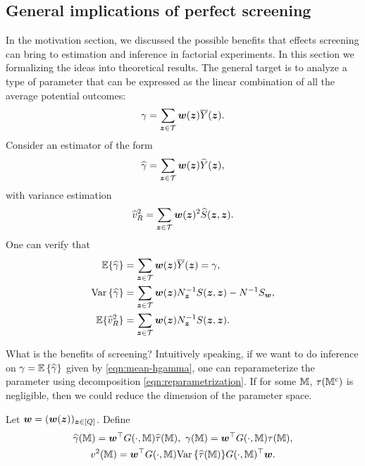 \documentclass[12pt]{article}
\begin{document}
\subsection{General implications of perfect screening}
In the motivation section, we discussed the possible benefits that effects screening can bring to estimation and inference in factorial experiments. In this section we formalizing the ideas into theoretical results. The general target is to analyze a type of parameter that can be expressed as the linear combination of all the average potential outcomes:
\begin{align}
\gamma = \sum_{{\boldsymbol{z}}\in{\mathcal{T}}} {\boldsymbol{w}}({\boldsymbol{z}})\overline{Y}({\boldsymbol{z}}). \label{eqn:target-gamma}
\end{align}
 Consider an estimator of the form
\begin{align}\label{eqn:hgamma}
    {\widehat{\gamma}} = \sum_{{\boldsymbol{z}}\in{\mathcal{T}}} {\boldsymbol{w}}({\boldsymbol{z}})\widehat{Y}({\boldsymbol{z}}),
\end{align}
with variance estimation
\begin{align}\label{eqn:hv2R}
    \widehat{v}^2_R = \sum_{{\boldsymbol{z}}\in{\mathcal{T}}} {\boldsymbol{w}}({\boldsymbol{z}})^2 \widehat{S}({\boldsymbol{z}},{\boldsymbol{z}}).
\end{align}
One can verify that 
\begin{align}
    {\mathbb{E}}\{{\widehat{\gamma}}\} &= \sum_{{\boldsymbol{z}}\in{\mathcal{T}}} {\boldsymbol{w}}({\boldsymbol{z}})\overline{Y}({\boldsymbol{z}}) = \gamma, \label{eqn:mean-hgamma}\\
    {\operatorname{Var}\left\{{\widehat{\gamma}}\right\}} &= \sum_{{\boldsymbol{z}}\in{\mathcal{T}}}{\boldsymbol{w}}({\boldsymbol{z}})N_{{\boldsymbol{z}}}^{-1}S({\boldsymbol{z}},{\boldsymbol{z}}) - N^{-1}S_{\boldsymbol{w}}, \label{eqn:var-hgamma}\\
    {\mathbb{E}}\{\widehat{v}_R^2\} & =  \sum_{{\boldsymbol{z}}\in{\mathcal{T}}} {\boldsymbol{w}}({\boldsymbol{z}})N_{{\boldsymbol{z}}}^{-1}S({\boldsymbol{z}},{\boldsymbol{z}}). \label{eqn:mean-varR}
\end{align}

What is the benefits of  screening? Intuitively speaking, if we want to do inference on $\gamma = {{\mathbb{E}}\left\{{\widehat{\gamma}}\right\}}$ given by \eqref{eqn:mean-hgamma}, one can reparameterize the parameter using  decomposition \eqref{eqn:reparametrization}. If for some ${\mathbb{M}}$, $\tau({\mathbb{M}}^c)$ is negligible, then we could reduce the dimension of the parameter space. 

Let ${\boldsymbol{w}} = ({\boldsymbol{w}}({\boldsymbol{z}}))_{{\boldsymbol{z}}\in[Q]} $. Define 
\begin{gather*}
    {\widehat{\gamma}}({{\mathbb{M}}}) = {\boldsymbol{w}}^\top G(\cdot, {{\mathbb{M}}}) {\widehat{\tau}}({{\mathbb{M}}}), ~\gamma({\mathbb{M}}) = {\boldsymbol{w}}^\top G(\cdot,{\mathbb{M}})\tau({\mathbb{M}}), \\
    v^2({\mathbb{M}}) =  {\boldsymbol{w}}^\top G(\cdot,{\mathbb{M}}){\operatorname{Var}\left\{{\widehat{\tau}}({\mathbb{M}})\right\}} G(\cdot,{\mathbb{M}})^\top{\boldsymbol{w}}.
\end{gather*}
\end{document}
